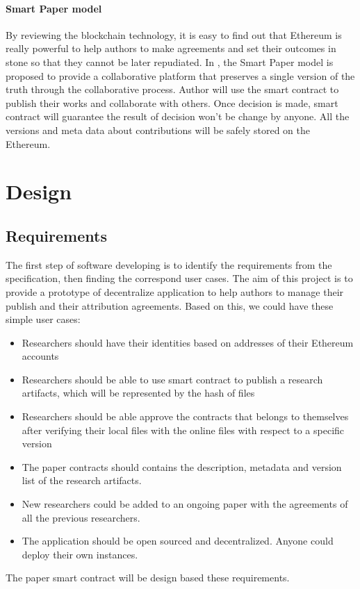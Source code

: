 \documentclass [12pt]{article}
\begin{document}
\paragraph{Smart Paper model}
By reviewing the blockchain technology, it is easy to find out that Ethereum is really powerful to
help authors to make agreements and set their outcomes in stone so that they cannot be later repudiated.
In \cite{Khoe:1994:CML:2288694.2294265}, 
the Smart Paper model is proposed to provide a collaborative platform 
that preserves a single version of the truth through the collaborative process. 
Author will use the smart contract to publish their works and collaborate with others.
Once decision is made, smart contract will guarantee the result of decision won't be change by anyone.
All the versions and meta data about contributions will be safely stored on the Ethereum.
\section{Design}
\subsection{Requirements}
The first step of software developing is to identify the requirements from the specification,
then finding the correspond user cases.
The aim of this project is to provide a prototype of decentralize application 
to help authors to manage their publish and their attribution agreements.
Based on this, we could have these simple user cases:
\begin{itemize}
  \item Researchers should have their identities based on addresses of their Ethereum accounts
  \item Researchers should be able to use smart contract to publish a research artifacts, which will be represented by the hash of files
  \item Researchers should be able approve the contracts that belongs to themselves after verifying their local files with the online files with respect to a specific version
  \item The paper contracts should contains the description, metadata and version list of the research artifacts.
  \item New researchers could be added to an ongoing paper with the agreements of all the previous researchers.
  \item The application should be open sourced and decentralized. Anyone could deploy their own instances.
\end{itemize}
The paper smart contract will be design based these requirements.  
\end{document}
